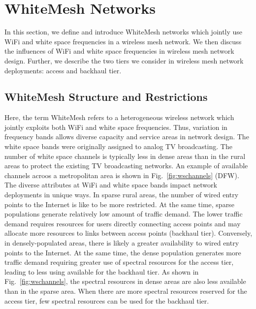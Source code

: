 \section{WhiteMesh Networks}
\label{sec:problemformulation}

In this section, we define and introduce WhiteMesh networks which jointly use WiFi and white space 
frequencies in a wireless mesh network. We then discuss the influences of WiFi and white 
space frequencies in wireless mesh network design. Further, we describe the two tiers we consider in 
wireless mesh network deployments: access and backhaul tier.


\subsection{WhiteMesh Structure and Restrictions}
\label{subsec:problem}
Here, the term WhiteMesh refers to a heterogeneous wireless network which jointly exploits 
both WiFi and white space frequencies. Thus, variation in frequency bands allows diverse 
capacity and service areas in network design.
The white space bands were originally assigned to analog TV broadcasting. The 
number of white space channels is typically less in dense areas than in the rural areas to protect the 
existing TV broadcasting networks. An example of available channels acroos a metropolitan area is shown in Fig.~\ref{fig:wschannels} (DFW). 
The diverse attributes at WiFi and white space bands impact network deployments in unique ways.
In sparse rural areas, the number of wired entry points to the Internet is like to be more restricted. 
At the same time, sparse populations generate relatively low amount of traffic 
demand. The lower traffic demand requires resources for users directly connecting access points
and may allocate more resources to links between access points (backhaul tier).
Conversely, in densely-populated areas, there is likely a greater availability to wired entry points to the Internet.
At the same time, the dense population generates more traffic demand requiring greater use of spectral resources
for the access tier, leading to less using available for the backhaul tier. 
As shown in Fig.~\ref{fig:wschannels}, the spectral resources in dense areas 
are also less available than in the sparse area. 
When there are more spectral resources reserved 
for the access tier, few spectral resources can be used for the backhaul tier.



